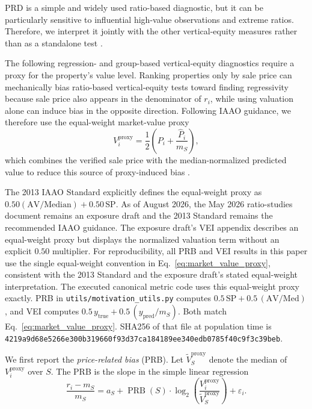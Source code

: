 \documentclass[10pt]{article}
\theoremstyle{definition}
\newcommand{\1}{\mathbf{1}}
\begin{document}
{PRD is a simple and widely used ratio-based diagnostic, but it can be particularly sensitive to influential high-value observations and extreme ratios. Therefore, we interpret it jointly with the other vertical-equity measures rather than as a standalone test \cite{IAAO2026ExposureRatio}.}


{The following regression- and group-based vertical-equity diagnostics require a proxy for the property's value level. Ranking properties only by sale price can mechanically bias ratio-based vertical-equity tests toward finding regressivity because sale price also appears in the denominator of $r_i$, while using valuation alone can induce bias in the opposite direction. Following IAAO guidance, we therefore use the equal-weight market-value proxy}
\begin{equation}
\label{eq:market_value_proxy}
V_i^{\mathrm{proxy}}
=
\frac{1}{2}
\left(
P_i+\frac{\widehat P_i}{m_S}
\right),
\end{equation}
{which combines the verified sale price with the median-normalized predicted value to reduce this source of proxy-induced bias \cite{IAAO2013Ratio,IAAO2026ExposureRatio}.}

The 2013 IAAO Standard explicitly defines the equal-weight proxy as $0.50(\mathrm{AV}/\mathrm{Median})+0.50\,\mathrm{SP}$. As of August 2026, the May 2026 ratio-studies document remains an exposure draft and the 2013 Standard remains the recommended IAAO guidance. The exposure draft's VEI appendix describes an equal-weight proxy but displays the normalized valuation term without an explicit $0.50$ multiplier. For reproducibility, all PRB and VEI results in this paper use the single equal-weight convention in Eq.~\eqref{eq:market_value_proxy}, consistent with the 2013 Standard and the exposure draft's stated equal-weight interpretation.
The executed canonical metric code uses this equal-weight proxy exactly. PRB in \texttt{utils/motivation\_utils.py} computes $0.5\,\mathrm{SP}+0.5\,(\mathrm{AV}/\mathrm{Med})$, and VEI computes $0.5\,y_{\mathrm{true}}+0.5\,(y_{\mathrm{pred}}/m_S)$. Both match Eq.~\eqref{eq:market_value_proxy}. SHA256 of that file at population time is \texttt{4219a9d68e5266e300b319660f93d37ca184189ee340edb0785f40c9f3c39beb}.

{We first report the \textit{price-related bias} (PRB).}
Let $\widetilde V_S^{\mathrm{proxy}}$ denote the median of $V_i^{\mathrm{proxy}}$ over $S$. The PRB is the slope in the simple linear regression
\begin{equation}
\label{eq:prb}
\frac{r_i-m_S}{m_S}
=
a_S
+
\operatorname{PRB}(S)\cdot
\log_2\left(
\frac{V_i^{\mathrm{proxy}}}
{\widetilde V_S^{\mathrm{proxy}}}
\right)
+
\varepsilon_i.
\end{equation}
\end{document}
